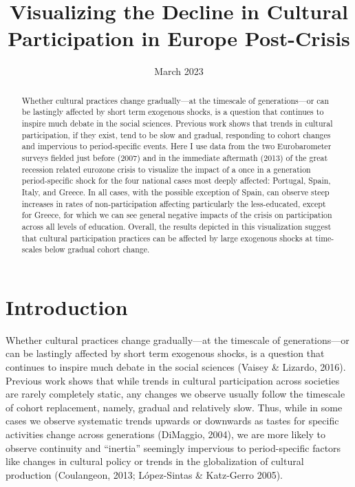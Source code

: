 \documentclass{article}
\title{Visualizing the Decline in Cultural Participation in Europe Post-Crisis}
\date{March 2023}
\begin{document}
\maketitle

\begin{abstract}
    Whether cultural practices change gradually---at the timescale of generations---or can be lastingly affected by short term exogenous shocks, is a question that continues to inspire much debate in the social sciences. Previous work shows that trends in cultural participation, if they exist, tend to be slow and gradual, responding to cohort changes and impervious to period-specific events. Here I use data from the two Eurobarometer surveys fielded just before (2007) and in the immediate aftermath (2013) of the great recession related eurozone crisis to visualize the impact of a once in a generation period-specific shock for the four national cases most deeply affected: Portugal, Spain, Italy, and Greece. In all cases, with the possible exception of Spain, can observe steep increases in rates of non-participation affecting particularly the less-educated, except for Greece, for which we can see general negative impacts of the crisis on participation across all levels of education. Overall, the results depicted in this visualization suggest that cultural participation practices can be affected by large exogenous shocks at time-scales below gradual cohort change.
\end{abstract}

\section{Introduction}
Whether cultural practices change gradually---at the timescale of generations---or can be lastingly affected by short term exogenous shocks, is a question that continues to inspire much debate in the social sciences (Vaisey \& Lizardo, 2016). Previous work shows that while trends in cultural participation across societies are rarely completely static, any changes we observe usually follow the timescale of cohort replacement, namely, gradual and relatively slow. Thus, while in some cases we observe systematic trends upwards or downwards as tastes for specific activities change across generations (DiMaggio, 2004), we are more likely to observe continuity and ``inertia'' seemingly impervious to period-specific factors like changes in cultural policy or trends in the globalization of cultural production (Coulangeon, 2013; López-Sintas \& Katz-Gerro 2005).
\end{document}
